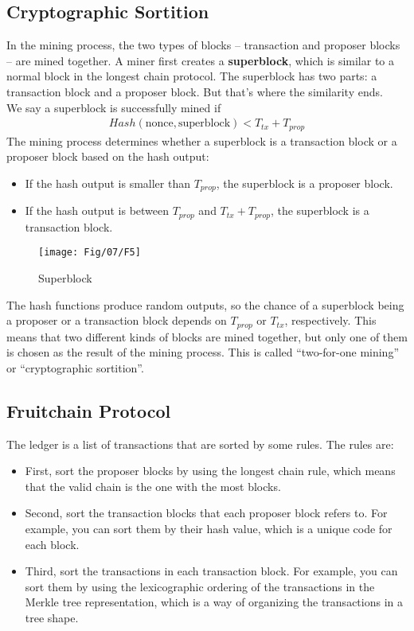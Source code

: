 \subsection{Cryptographic Sortition}
In the mining process, the two types of blocks – transaction and proposer blocks – are mined together. A miner first creates a \textbf{superblock}, which is similar to a normal block in the longest chain protocol. The superblock has two parts: a transaction block and a proposer block. But that’s where the similarity ends.\\
We say a superblock is successfully mined if 
\begin{align*}
	Hash(\text{nonce}, \text{superblock}) < T_{tx} + T_{prop} 
\end{align*}
The mining process determines whether a superblock is a transaction block or a proposer block based on the hash output:
\begin{itemize}
	\item If the hash output is smaller than $T_{prop}$, the superblock is a proposer block.
	\item If the hash output is between $T_{prop}$ and $T_{tx} + T_{prop}$, the superblock is a transaction block.
\end{itemize}
\begin{figure}[h!]
	\centering
	\texttt{[image: Fig/07/F5]}
	\caption{Superblock}
	\label{fig:l7_f5}
\end{figure}
The hash functions produce random outputs, so the chance of a superblock being a proposer or a transaction block depends on $T_{prop}$ or $T_{tx}$, respectively. This means that two different kinds of blocks are mined together, but only one of them is chosen as the result of the mining process. This is called “two-for-one mining” or “cryptographic sortition”.
\subsection{Fruitchain Protocol}
The ledger is a list of transactions that are sorted by some rules. The rules are:
\begin{itemize}
	\item First, sort the proposer blocks by using the longest chain rule, which means that the valid chain is the one with the most blocks.
	\item Second, sort the transaction blocks that each proposer block refers to. For example, you can sort them by their hash value, which is a unique code for each block.
	\item Third, sort the transactions in each transaction block. For example, you can sort them by using the lexicographic ordering of the transactions in the Merkle tree representation, which is a way of organizing the transactions in a tree shape.
\end{itemize}
